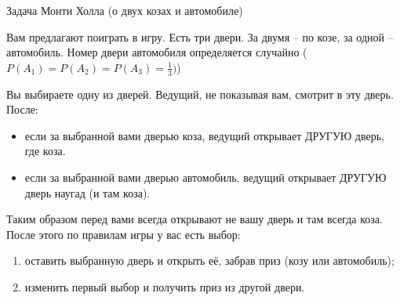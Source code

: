 \begin{frame}{Задача Монти Холла (о двух козах и автомобиле)}
\footnotesize

Вам предлагают поиграть в игру. Есть три двери. За двумя -- по козе, за одной -- автомобиль. 
Номер двери автомобиля определяется случайно ($P(A_1)=P(A_2)=P(A_3)=\frac{1}{3})$)

Вы выбираете одну из дверей. 
Ведущий, не показывая вам, смотрит в эту дверь. После:
\begin{itemize}
	\item если за выбранной вами дверью коза, ведущий открывает ДРУГУЮ дверь, где коза.
	\item если за выбранной вами дверью автомобиль, ведущий открывает ДРУГУЮ дверь наугад (и там коза).
\end{itemize}
Таким образом перед вами всегда открывают не вашу дверь и там всегда коза.
После этого по правилам игры у вас есть выбор:
\begin{enumerate}
	\item оставить выбранную дверь и открыть её, забрав приз (козу или автомобиль);
	\item изменить первый выбор и получить приз из другой двери.
\end{enumerate}

	
\end{frame}


